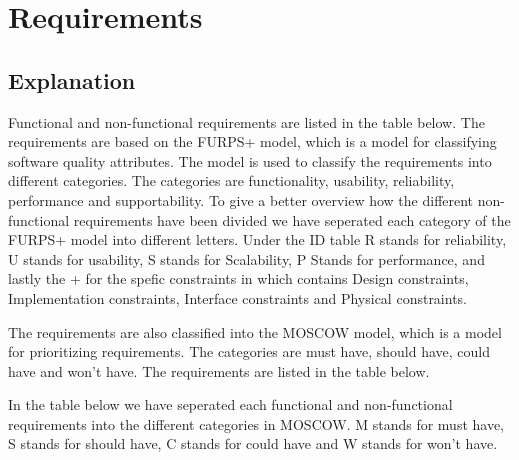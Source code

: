 
\section{Requirements}

\subsection{Explanation}
Functional and non-functional requirements are listed in the table below. The requirements are based on the FURPS+ model, which is a model for classifying software quality attributes. The model is used to classify the requirements into different categories. The categories are functionality, usability, reliability, performance and supportability.
To give a better overview how the different non-functional requirements have been divided we have seperated each category of the FURPS+ model into different letters. Under the ID table R stands for reliability, U stands for usability, S stands for Scalability, P Stands for performance, and lastly the + for the spefic constraints in which contains Design constraints, Implementation constraints, Interface constraints and Physical constraints. \newline

The requirements are also classified into the MOSCOW model, which is a model for prioritizing requirements. The categories are must have, should have, could have and won't have. The requirements are listed in the table below. \newline

In the table below we have seperated each functional and non-functional requirements into the different categories in MOSCOW. M stands for must have, S stands for should have, C stands for could have and W stands for won't have.\cite{example} \newline


